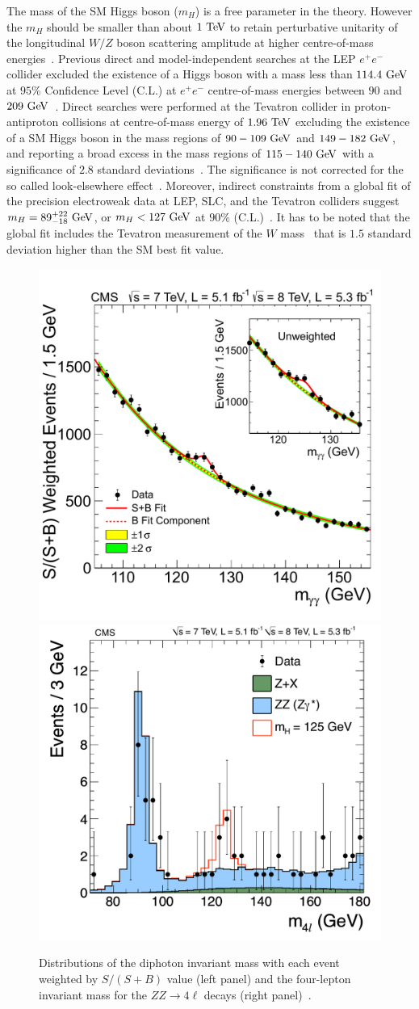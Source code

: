 The mass of the SM Higgs boson ($m_{H}$) is a free parameter in the theory. However the $m_{H}$ should be smaller than about $1~\mathrm{Te\kern -0.1em V}$ to retain perturbative unitarity of the longitudinal $W/Z$ boson scattering amplitude at higher centre-of-mass energies~\cite{Cornwall:1973tb,Cornwall:1974km,LlewellynSmith:1973yud,Lee:1977eg}.  Previous direct and model-independent searches at the LEP $e^{+}e^{-}$ collider excluded the existence of a Higgs boson with a mass less than $114.4~\mathrm{Ge\kern -0.1em V}$ at $95\%$ Confidence Level (C.L.) at $e^+e^-$ centre-of-mass energies between $90$ and $209~\mathrm{Ge\kern -0.1em V}$~\cite{Barate:2003sz}. Direct searches were performed at the Tevatron collider in proton-antiproton collisions at centre-of-mass energy of $1.96~\mathrm{Te\kern -0.1em V}$ excluding the existence of a SM Higgs boson in the mass regions of $90-109~\mathrm{Ge\kern -0.1em V}$ and $149-182~\mathrm{Ge\kern -0.1em V}$, and reporting a broad excess in the mass regions of $115-140~\mathrm{Ge\kern -0.1em V}$ with a significance of $2.8$ standard deviations~\cite{Aaltonen:2013ioz}. The significance is not corrected for the so called look-elsewhere effect~\cite{loook}. Moreover, indirect constraints from a global fit of the precision electroweak data at LEP, SLC, and the Tevatron colliders suggest $m_{H}=89^{+22}_{-18}~\mathrm{Ge\kern -0.1em V}$, or $m_{H}<127~\mathrm{Ge\kern -0.1em V}$ at $90\%$ (C.L.)~\cite{Agashe:2014kda}. It has to be noted that the global fit includes the Tevatron measurement of the $W$ mass~\cite{Aaltonen:2013iut} that is $1.5$ standard deviation higher than the SM best fit value. 

\begin{figure}[h]
\centering
\includegraphics[width=0.49\columnwidth]{figures_chapter2/gammagamma}
\includegraphics[width=0.49\columnwidth]{figures_chapter2/zz4l}
\caption{Distributions of the diphoton invariant mass with each event weighted by $S/(S+B)$ value (left panel) and the four-lepton invariant mass for the $ZZ \rightarrow 4 \ell$ decays (right panel)~\cite{Chatrchyan:2012xdj}.}
\label{fig:cms_higgs}
\end{figure}

